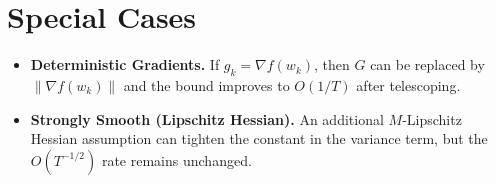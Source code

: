 \documentclass[11pt]{article}
\newcommand{\norm}[1]{\left\|#1\right\|}
\begin{document}
\section*{Special Cases}
\begin{itemize}
\item \textbf{Deterministic Gradients.} If $g_k=\nabla f(w_k)$, then $G$ can be replaced by $\norm{\nabla f(w_k)}$ and the bound improves to $O(1/T)$ after telescoping.
\item \textbf{Strongly Smooth (Lipschitz Hessian).} An additional $M$‑Lipschitz Hessian assumption can tighten the constant in the variance term, but the $O(T^{-1/2})$ rate remains unchanged.
\end{itemize}

\end{document}
